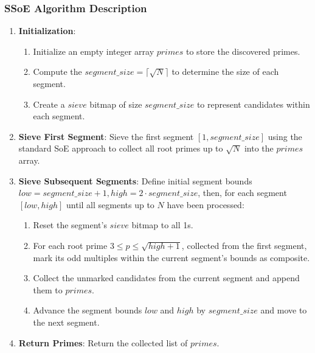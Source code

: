 \documentclass{article}
\begin{document}
\subsubsection*{SSoE Algorithm Description}
\begin{enumerate}[noitemsep]
    \item \textbf{Initialization}:
    \begin{enumerate}
        \item Initialize an empty integer array $primes$ to store the discovered primes.
        \item Compute the $segment\_size = \lceil\sqrt{N}\rceil$ to determine the size of each segment.
        \item Create a $sieve$ bitmap of size $segment\_size$ to represent candidates within each segment.
    \end{enumerate}
    \item \textbf{Sieve First Segment}: Sieve the first segment $[1, segment\_size]$ using the standard SoE approach to collect all root primes up to $\sqrt{N}$ into the $primes$ array.
    \item \textbf{Sieve Subsequent Segments}: Define initial segment bounds $low = segment\_size + 1, high = 2 \cdot segment\_size$, then, for each segment $[low, high]$ until all segments up to $N$ have been processed: 
    \begin{enumerate}
        \item Reset the segment's $sieve$ bitmap to all 1s.
        \item For each root prime $3 \le p \le \sqrt{high + 1}$, collected from the first segment, mark its odd multiples within the current segment's bounds as composite.
        \item Collect the unmarked candidates from the current segment and append them to $primes$.
        \item Advance the segment bounds $low$ and $high$ by $segment\_size$ and move to the next segment.
    \end{enumerate}
    \item \textbf{Return Primes}: Return the collected list of $primes$.
\end{enumerate}
\end{document}
